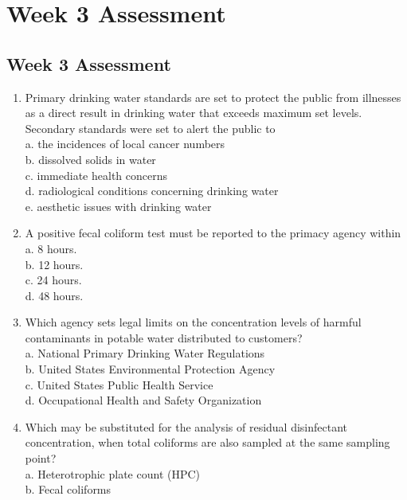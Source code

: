 
\chapter{Week 3 Assessment}

\section*{Week 3 Assessment}
\begin{enumerate}[1.]
\item Primary drinking water standards are set to protect the public from illnesses as a direct result in drinking water that exceeds maximum set levels. Secondary standards were set to alert the public to\\
a. the incidences of local cancer numbers\\
b. dissolved solids in water\\
c. immediate health concerns\\
d. radiological conditions concerning drinking water\\
e. aesthetic issues with drinking water\\
\item A positive fecal coliform test must be reported to the primacy agency within\\
a. 8 hours.\\
b. 12 hours.\\
c. 24 hours.\\
d. 48 hours.\\
\item Which agency sets legal limits on the concentration levels of harmful contaminants in potable water distributed to customers?\\
a. National Primary Drinking Water Regulations\\
b. United States Environmental Protection Agency\\
c. United States Public Health Service\\
d. Occupational Health and Safety Organization\\
\item Which may be substituted for the analysis of residual disinfectant concentration, when total coliforms are also sampled at the same sampling point?\\
a. Heterotrophic plate count (HPC)\\
b. Fecal coliforms\\

\end{enumerate}
